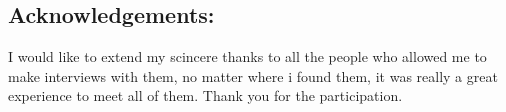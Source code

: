 \documentclass{article}
\begin{document}
\begin{center}
\section{ Acknowledgements:}
\vspace{5mm}
I would like to extend my scincere thanks to all the people who allowed me to make interviews with them, no matter where i found them, it was really a great experience to meet all of them. Thank you for the participation.
\end{center}
\end{document}
